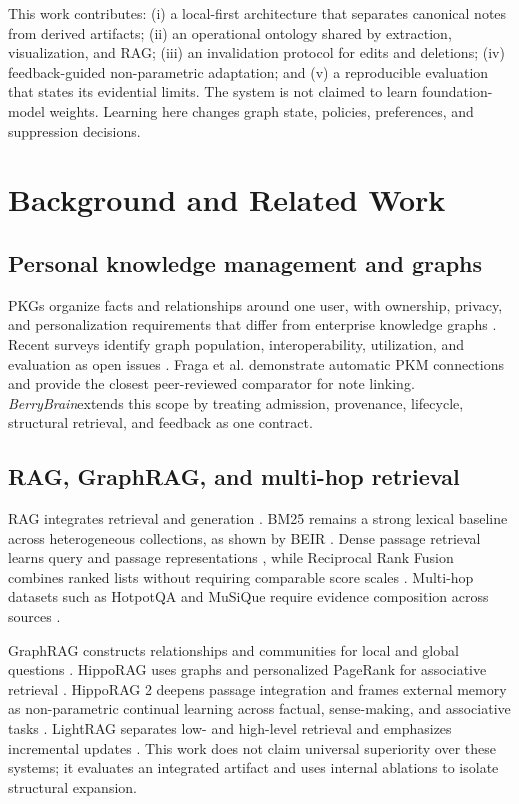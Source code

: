 \documentclass{sbc2023}
\newcommand{\BerryBrain}{\textit{BerryBrain}}
\begin{document}
This work contributes: (i) a local-first architecture that separates canonical notes from derived
artifacts; (ii) an operational ontology shared by extraction, visualization, and RAG; (iii) an
invalidation protocol for edits and deletions; (iv) feedback-guided non-parametric adaptation; and
(v) a reproducible evaluation that states its evidential limits. The system is not claimed to
learn foundation-model weights. Learning here changes graph state, policies, preferences, and
suppression decisions.

\section{Background and Related Work}
\label{sec:related}

\subsection{Personal knowledge management and graphs}

PKGs organize facts and relationships around one user, with ownership, privacy, and
personalization requirements that differ from enterprise knowledge graphs
\cite{balog2019pkg}. Recent surveys identify graph population, interoperability, utilization, and
evaluation as open issues \cite{chakraborty2023survey,skjaeveland2024ecosystem}. Fraga et al.
\cite{fraga2024connections} demonstrate automatic PKM connections and provide the closest
peer-reviewed comparator for note linking. \BerryBrain extends this scope by treating admission,
provenance, lifecycle, structural retrieval, and feedback as one contract.

\subsection{RAG, GraphRAG, and multi-hop retrieval}

RAG integrates retrieval and generation \cite{lewis2020rag}. BM25 remains a strong lexical
baseline across heterogeneous collections, as shown by BEIR \cite{thakur2021beir}. Dense passage
retrieval learns query and passage representations \cite{karpukhin2020dpr}, while Reciprocal Rank
Fusion combines ranked lists without requiring comparable score scales
\cite{cormack2009rrf}. Multi-hop datasets such as HotpotQA and MuSiQue require evidence composition
across sources \cite{yang2018hotpotqa,trivedi2022musique}.

GraphRAG constructs relationships and communities for local and global questions
\cite{edge2024graphrag}. HippoRAG uses graphs and personalized PageRank for associative retrieval
\cite{gutierrez2024hipporag}. HippoRAG 2 deepens passage integration and frames external memory as
non-parametric continual learning across factual, sense-making, and associative tasks
\cite{gutierrez2025hipporag2}. LightRAG separates low- and high-level retrieval and emphasizes
incremental updates \cite{guo2024lightrag}. This work does not claim universal superiority over
these systems; it evaluates an integrated artifact and uses internal ablations to isolate
structural expansion.
\end{document}

